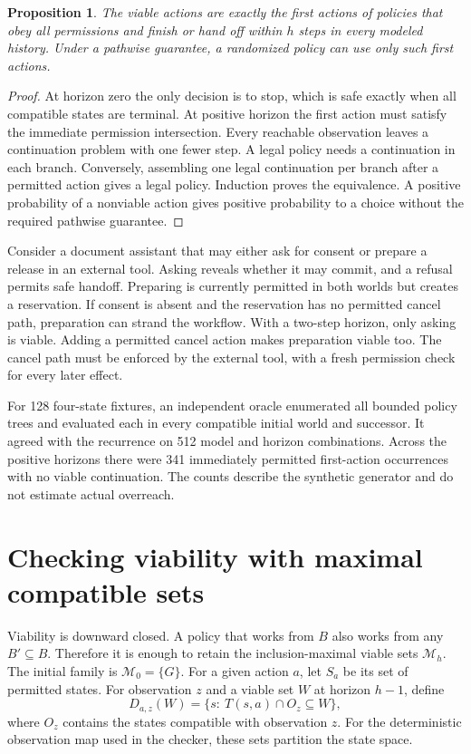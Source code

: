 \documentclass[11pt]{article}
\newtheorem{proposition}{Proposition}
\begin{document}
\begin{proposition}
The viable actions are exactly the first actions of policies
that obey all permissions and finish or hand off within $h$
steps in every modeled history. Under a pathwise guarantee,
a randomized policy can use only such first actions.
\end{proposition}
\begin{proof}
At horizon zero the only decision is to stop, which is safe
exactly when all compatible states are terminal. At positive
horizon the first action must satisfy the immediate permission
intersection. Every reachable observation leaves a continuation
problem with one fewer step. A legal policy needs a continuation
in each branch. Conversely, assembling one legal continuation
per branch after a permitted action gives a legal policy.
Induction proves the equivalence. A positive probability of a
nonviable action gives positive probability to a choice without
the required pathwise guarantee.
\end{proof}

Consider a document assistant that may either ask for consent
or prepare a release in an external tool. Asking reveals whether
it may commit, and a refusal permits safe handoff. Preparing is
currently permitted in both worlds but creates a reservation.
If consent is absent and the reservation has no permitted
cancel path, preparation can strand the workflow. With a
two-step horizon, only asking is viable. Adding a permitted
cancel action makes preparation viable too. The cancel path
must be enforced by the external tool, with a fresh permission
check for every later effect.

For 128 four-state fixtures, an independent oracle enumerated
all bounded policy trees and evaluated each in every compatible
initial world and successor. It agreed with the recurrence on
512 model and horizon combinations. Across the positive
horizons there were 341 immediately permitted first-action
occurrences with no viable continuation. The counts describe
the synthetic generator and do not estimate actual overreach.

\section{Checking viability with maximal compatible sets}
Viability is downward closed. A policy that works from $B$ also
works from any $B'\subseteq B$. Therefore it is enough to retain the
inclusion-maximal viable sets $\mathcal M_h$. The initial family is
$\mathcal M_0=\{G\}$. For a given action $a$, let $S_a$ be its set
of permitted states. For observation $z$ and a viable set $W$ at
horizon $h-1$, define
\[
 D_{a,z}(W)=\{s:\ T(s,a)\cap O_z\subseteq W\},
\]
where $O_z$ contains the states compatible with observation $z$.
For the deterministic observation map used in the checker, these
sets partition the state space.
\end{document}
